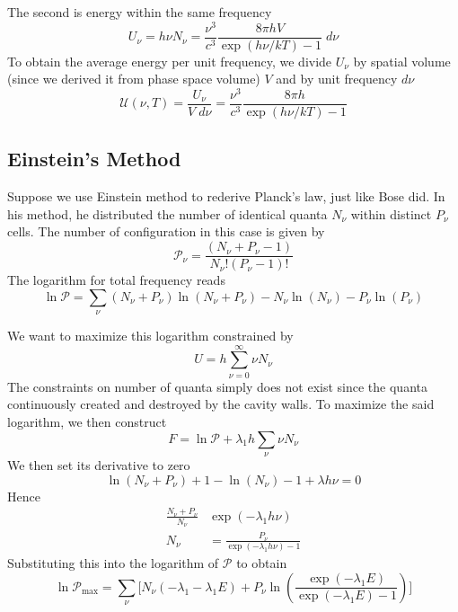 \documentclass[../../../Main.tex]{subfiles}
\begin{document}
The second is energy within the same frequency
\begin{equation*}
    U_\nu=h\nu N_\nu =\frac{\nu^3}{c^3}\frac{8\pi h V}{\exp(h\nu/k T)-1}\;d\nu
\end{equation*}
To obtain the average energy per unit frequency, we divide $U_\nu$ by spatial volume (since we derived it from phase space volume) $V$ and by unit frequency $d\nu$
\begin{equation*}
    \mathcal{U}(\nu,T)=\frac{U_\nu}{V\;d\nu}=\frac{\nu^3}{c^3}\frac{8\pi h}{\exp(h\nu/k T)-1}
\end{equation*}

\subsection{Einstein's Method}
Suppose we use Einstein method to rederive Planck's law, just like Bose did. In his method, he distributed the number of identical quanta $N_\nu$ within distinct $P_\nu$ cells. The number of configuration in this case is given by 
\begin{equation*}
    \mathcal{P}_\nu=\frac{(N_\nu+P_\nu-1)}{N_\nu! (P_\nu-1)!}
\end{equation*}
The logarithm for total frequency reads
\begin{equation*}
    \ln \mathcal{P}=\sum_\nu (N_\nu+P_\nu)\ln (N_\nu+P_\nu)-N_\nu\ln(N_\nu)- P_\nu \ln (P_\nu)
\end{equation*}

We want to maximize this logarithm constrained by 
\begin{equation*}
    U=h\sum_{\nu=0}^{\infty} \nu N_\nu
\end{equation*}
The constraints on number of quanta simply does not exist since the quanta continuously created and destroyed by the cavity walls. To maximize the said logarithm, we then construct
\begin{equation*}
    F=\ln \mathcal{P}+\lambda_1h\sum_{\nu} \nu N_\nu
\end{equation*}
We then set its derivative to zero 
\begin{equation*}
    \ln(N_\nu+P_\nu) +1 -\ln(N_\nu) -1 +\lambda h\nu=0
\end{equation*}
Hence
\begin{align*}
    \frac{N_\nu+P_\nu}{N_\nu}&\exp(-\lambda_1h\nu)\\
    N_\nu&=\frac{P_\nu}{\exp(-\lambda_1 h\nu)-1}
\end{align*}
Substituting this into the logarithm of $\mathcal{P}$ to obtain
\begin{equation*}
    \ln \mathcal{P}_{\max}=\sum_\nu \Bigg[N_\nu \left(-\lambda_1-\lambda_1 E\right)
    + P_\nu\ln\left(\frac{\exp(-\lambda_1E)}{\exp(-\lambda_1E)-1}\right)\Bigg]
\end{equation*}
\end{document}
